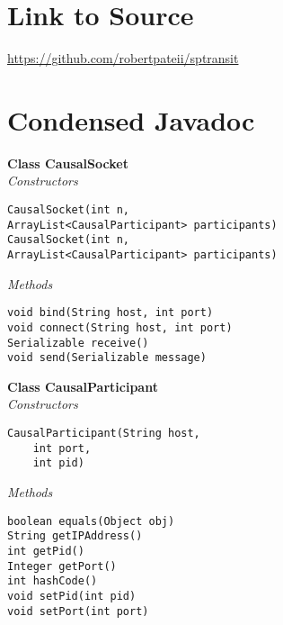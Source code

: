 \documentclass[11pt,journal,compsoc]{IEEEtran}
\begin{document}
\appendices
\section{Link to Source}
\url{https://github.com/robertpateii/sptransit}

\section{Condensed Javadoc}

\textbf{Class CausalSocket}
\\
\emph{Constructors}
\begin{lstlisting}
CausalSocket(int n,
ArrayList<CausalParticipant> participants)
CausalSocket(int n,
ArrayList<CausalParticipant> participants) 
\end{lstlisting}

\emph{Methods}
\begin{lstlisting}
void bind(String host, int port)
void connect(String host, int port) 
Serializable receive() 
void send(Serializable message) 

\end{lstlisting}
\textbf{Class CausalParticipant}
\\
\emph{Constructors}
\begin{lstlisting}
CausalParticipant(String host, 
    int port, 
    int pid) 
\end{lstlisting}
\emph{Methods}
\begin{lstlisting}
boolean	equals(Object obj) 
String getIPAddress() 
int	getPid() 
Integer getPort() 
int	hashCode() 
void setPid(int pid) 
void setPort(int port) 

\end{lstlisting}
\newpage
\end{document}

